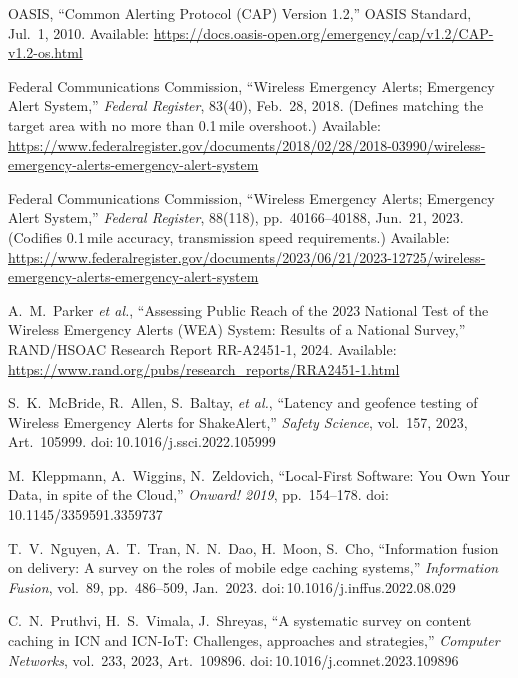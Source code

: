 \begin{thebibliography}{99}

OASIS, ``Common Alerting Protocol (CAP) Version 1.2,'' OASIS Standard, Jul.\ 1, 2010. Available: \url{https://docs.oasis-open.org/emergency/cap/v1.2/CAP-v1.2-os.html}

Federal Communications Commission, ``Wireless Emergency Alerts; Emergency Alert System,'' \emph{Federal Register}, 83(40), Feb.\ 28, 2018. (Defines matching the target area with no more than 0.1\,mile overshoot.) Available: \url{https://www.federalregister.gov/documents/2018/02/28/2018-03990/wireless-emergency-alerts-emergency-alert-system}

Federal Communications Commission, ``Wireless Emergency Alerts; Emergency Alert System,'' \emph{Federal Register}, 88(118), pp.\ 40166--40188, Jun.\ 21, 2023. (Codifies 0.1\,mile accuracy, transmission speed requirements.) Available: \url{https://www.federalregister.gov/documents/2023/06/21/2023-12725/wireless-emergency-alerts-emergency-alert-system}

A.\ M.\ Parker \emph{et al.}, ``Assessing Public Reach of the 2023 National Test of the Wireless Emergency Alerts (WEA) System: Results of a National Survey,'' RAND/HSOAC Research Report RR-A2451-1, 2024. Available: \url{https://www.rand.org/pubs/research_reports/RRA2451-1.html}

S.\ K.\ McBride, R.\ Allen, S.\ Baltay, \emph{et al.}, ``Latency and geofence testing of Wireless Emergency Alerts for ShakeAlert,'' \emph{Safety Science}, vol.\ 157, 2023, Art.\ 105999. doi:\,10.1016/j.ssci.2022.105999

M.\ Kleppmann, A.\ Wiggins, N.\ Zeldovich, ``Local-First Software: You Own Your Data, in spite of the Cloud,'' \emph{Onward! 2019}, pp.\ 154--178. doi:\,10.1145/3359591.3359737

T.\ V.\ Nguyen, A.\ T.\ Tran, N.\ N.\ Dao, H.\ Moon, S.\ Cho, ``Information fusion on delivery: A survey on the roles of mobile edge caching systems,'' \emph{Information Fusion}, vol.\ 89, pp.\ 486--509, Jan.\ 2023. doi:\,10.1016/j.inffus.2022.08.029

C.\ N.\ Pruthvi, H.\ S.\ Vimala, J.\ Shreyas, ``A systematic survey on content caching in ICN and ICN-IoT: Challenges, approaches and strategies,'' \emph{Computer Networks}, vol.\ 233, 2023, Art.\ 109896. doi:\,10.1016/j.comnet.2023.109896


\end{thebibliography}
